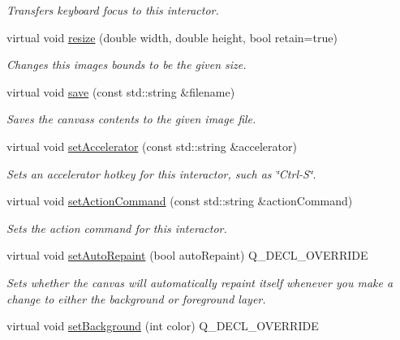 \begin{DoxyCompactItemize}
\begin{DoxyCompactList}\small\item\em Transfers keyboard focus to this interactor. \end{DoxyCompactList}\item 
virtual void \mbox{\hyperlink{classGCanvas_a090053938117ab698c4c9c1f1cff74a9}{resize}} (double width, double height, bool retain=true)
\begin{DoxyCompactList}\small\item\em Changes this image\textquotesingle{}s bounds to be the given size. \end{DoxyCompactList}\item 
virtual void \mbox{\hyperlink{classGCanvas_a2c027edbcd25b820dc6e21a9a3ad0496}{save}} (const std\+::string \&filename)
\begin{DoxyCompactList}\small\item\em Saves the canvas\textquotesingle{}s contents to the given image file. \end{DoxyCompactList}\item 
virtual void \mbox{\hyperlink{classGInteractor_ad15f102f62e2960576012f1aa0ba4b2e}{set\+Accelerator}} (const std\+::string \&accelerator)
\begin{DoxyCompactList}\small\item\em Sets an accelerator hotkey for this interactor, such as \char`\"{}\+Ctrl-\/\+S\char`\"{}. \end{DoxyCompactList}\item 
virtual void \mbox{\hyperlink{classGInteractor_a4b5843fe3030e038a1ba54cc03389bcf}{set\+Action\+Command}} (const std\+::string \&action\+Command)
\begin{DoxyCompactList}\small\item\em Sets the action command for this interactor. \end{DoxyCompactList}\item 
virtual void \mbox{\hyperlink{classGCanvas_ade731c276cd0bcd37639280d06571333}{set\+Auto\+Repaint}} (bool auto\+Repaint) Q\+\_\+\+D\+E\+C\+L\+\_\+\+O\+V\+E\+R\+R\+I\+DE
\begin{DoxyCompactList}\small\item\em Sets whether the canvas will automatically repaint itself whenever you make a change to either the background or foreground layer. \end{DoxyCompactList}\item 
virtual void \mbox{\hyperlink{classGCanvas_a427fefbbc34e39e5df27a807da488e0d}{set\+Background}} (int color) Q\+\_\+\+D\+E\+C\+L\+\_\+\+O\+V\+E\+R\+R\+I\+DE

\end{DoxyCompactItemize}
